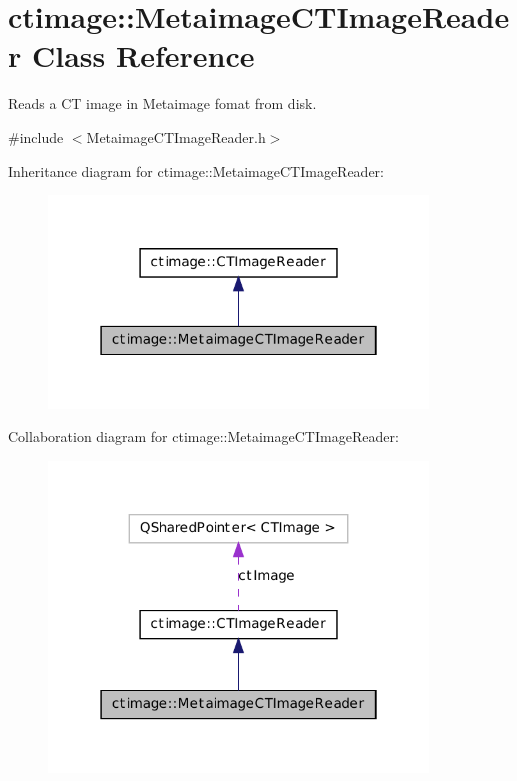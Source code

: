 \hypertarget{classctimage_1_1_metaimage_c_t_image_reader}{
\section{ctimage::MetaimageCTImageReader Class Reference}
\label{classctimage_1_1_metaimage_c_t_image_reader}
}


Reads a CT image in Metaimage fomat from disk.  




{\ttfamily \#include $<$MetaimageCTImageReader.h$>$}



Inheritance diagram for ctimage::MetaimageCTImageReader:\nopagebreak
\begin{figure}[H]
\begin{center}
\leavevmode
\includegraphics[width=286pt]{classctimage_1_1_metaimage_c_t_image_reader__inherit__graph}
\end{center}
\end{figure}


Collaboration diagram for ctimage::MetaimageCTImageReader:\nopagebreak
\begin{figure}[H]
\begin{center}
\leavevmode
\includegraphics[width=286pt]{classctimage_1_1_metaimage_c_t_image_reader__coll__graph}
\end{center}
\end{figure}
